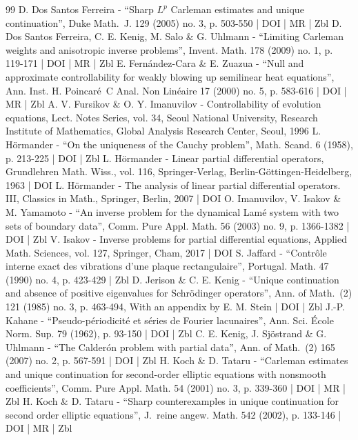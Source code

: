 \documentclass[10pt]{amsart}
\theoremstyle{plain}
\theoremstyle{definition}
\begin{document}
\begin{thebibliography}{99}
D. Dos Santos Ferreira - “Sharp $L^p$ Carleman estimates and unique continuation”, Duke Math. J. 129 (2005) no. 3, p. 503-550 | DOI | MR | Zbl
D. Dos Santos Ferreira, C. E. Kenig, M. Salo \& G. Uhlmann - “Limiting Carleman weights and anisotropic inverse problems”, Invent. Math. 178 (2009) no. 1, p. 119-171 | DOI | MR | Zbl
E. Fernández-Cara \& E. Zuazua - “Null and approximate controllability for weakly blowing up semilinear heat equations”, Ann. Inst. H. Poincaré C Anal. Non Linéaire 17 (2000) no. 5, p. 583-616 | DOI | MR | Zbl
A. V. Fursikov \& O. Y. Imanuvilov - Controllability of evolution equations, Lect. Notes Series, vol. 34, Seoul National University, Research Institute of Mathematics, Global Analysis Research Center, Seoul, 1996
L. Hörmander - “On the uniqueness of the Cauchy problem”, Math. Scand. 6 (1958), p. 213-225 | DOI | Zbl
L. Hörmander - Linear partial differential operators, Grundlehren Math. Wiss., vol. 116, Springer-Verlag, Berlin-Göttingen-Heidelberg, 1963 | DOI
L. Hörmander - The analysis of linear partial differential operators. III, Classics in Math., Springer, Berlin, 2007 | DOI
O. Imanuvilov, V. Isakov \& M. Yamamoto - “An inverse problem for the dynamical Lamé system with two sets of boundary data”, Comm. Pure Appl. Math. 56 (2003) no. 9, p. 1366-1382 | DOI | Zbl
V. Isakov - Inverse problems for partial differential equations, Applied Math. Sciences, vol. 127, Springer, Cham, 2017 | DOI
S. Jaffard - “Contrôle interne exact des vibrations d’une plaque rectangulaire”, Portugal. Math. 47 (1990) no. 4, p. 423-429 | Zbl
D. Jerison \& C. E. Kenig - “Unique continuation and absence of positive eigenvalues for Schrödinger operators”, Ann. of Math. (2) 121 (1985) no. 3, p. 463-494, With an appendix by E. M. Stein | DOI | Zbl
J.-P. Kahane - “Pseudo-périodicité et séries de Fourier lacunaires”, Ann. Sci. École Norm. Sup. 79 (1962), p. 93-150 | DOI | Zbl
C. E. Kenig, J. Sjöstrand \& G. Uhlmann - “The Calderón problem with partial data”, Ann. of Math. (2) 165 (2007) no. 2, p. 567-591 | DOI | Zbl
H. Koch \& D. Tataru - “Carleman estimates and unique continuation for second-order elliptic equations with nonsmooth coefficients”, Comm. Pure Appl. Math. 54 (2001) no. 3, p. 339-360 | DOI | MR | Zbl
H. Koch \& D. Tataru - “Sharp counterexamples in unique continuation for second order elliptic equations”, J. reine angew. Math. 542 (2002), p. 133-146 | DOI | MR | Zbl

\end{thebibliography}
\end{document}
